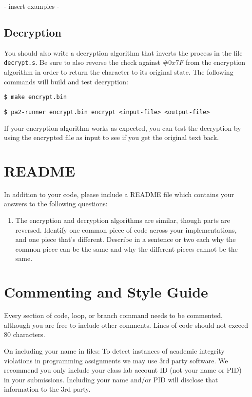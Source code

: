 \documentclass{article}
\begin{document}
- insert examples -

\subsection{Decryption}

You should also write a decryption algorithm that inverts the process in the
file \texttt{decrypt.s}. Be sure to also reverse the check against $\#0x7F$ 
from the encryption algorithm in order to return the character to its original
state. The following commands will build and test decryption:

\begin{verbatim}
$ make encrypt.bin
\end{verbatim}

\begin{verbatim}
$ pa2-runner encrypt.bin encrypt <input-file> <output-file>
\end{verbatim}

If your encryption algorithm works as expected, you can test the decryption by
using the encrypted file as input to see if you get the original text back.

\section{README}

In addition to your code, please include a README file which contains your
answers to the following questions:

\begin{enumerate}

\item The encryption and decryption algorithms are similar, though parts are
reversed. Identify one common piece of code across your implementations, and
one piece that's different. Describe in a sentence or two each why the common
piece can be the same and why the different pieces cannot be the same.

\end{enumerate}

\section{Commenting and Style Guide}

Every section of code, loop, or branch command needs to be commented, although
you are free to include other comments. Lines of code should not exceed 80
characters.

On including your name in files: To detect instances of academic integrity
violations in programming assignments we may use 3rd party software.  We
recommend you only include your class lab account ID (not your name or PID) in
your submissions.  Including your name and/or PID will disclose that
information to the 3rd party.
\end{document}
